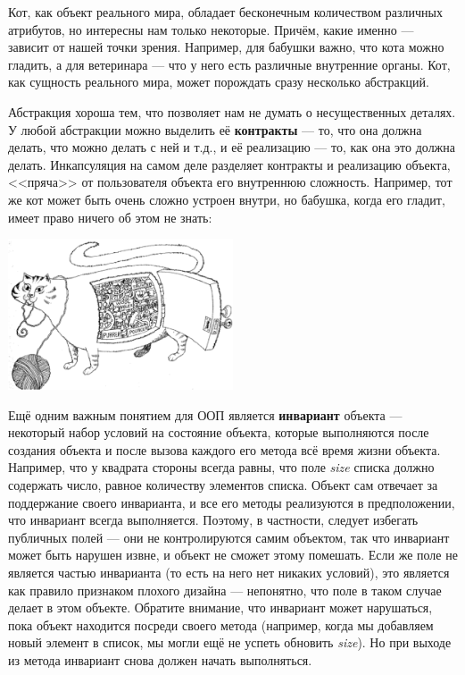 \documentclass{../../text-style}
\begin{document}
Кот, как объект реального мира, обладает бесконечным количеством различных атрибутов, но интересны нам только некоторые. Причём, какие именно --- зависит от нашей точки зрения. Например, для бабушки важно, что кота можно гладить, а для ветеринара --- что у него есть различные внутренние органы. Кот, как сущность реального мира, может порождать сразу несколько абстракций.

Абстракция хороша тем, что позволяет нам не думать о несущественных деталях. У любой абстракции можно выделить её \textbf{контракты} --- то, что она должна делать, что можно делать с ней и т.д., и её реализацию --- то, как она это должна делать. Инкапсуляция на самом деле разделяет контракты и реализацию объекта, <<пряча>> от пользователя объекта его внутреннюю сложность. Например, тот же кот может быть очень сложно устроен внутри, но бабушка, когда его гладит, имеет право ничего об этом не знать:

\begin{center}
    \includegraphics[width=0.5\textwidth]{incapsulation.png}
\end{center}

Ещё одним важным понятием для ООП является \textbf{инвариант} объекта --- некоторый набор условий на состояние объекта, которые выполняются после создания объекта и после вызова каждого его метода всё время жизни объекта. Например, что у квадрата стороны всегда равны, что поле \textit{size} списка должно содержать число, равное количеству элементов списка. Объект сам отвечает за поддержание своего инварианта, и все его методы реализуются в предположении, что инвариант всегда выполняется. Поэтому, в частности, следует избегать публичных полей --- они не контролируются самим объектом, так что инвариант может быть нарушен извне, и объект не сможет этому помешать. Если же поле не является частью инварианта (то есть на него нет никаких условий), это является как правило признаком плохого дизайна --- непонятно, что поле в таком случае делает в этом объекте. Обратите внимание, что инвариант может нарушаться, пока объект находится посреди своего метода (например, когда мы добавляем новый элемент в список, мы могли ещё не успеть обновить \textit{size}). Но при выходе из метода инвариант снова должен начать выполняться.
\end{document}
